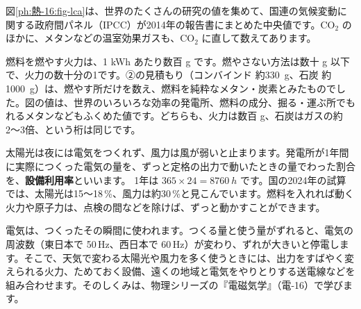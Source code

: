 図\ref{ph:熱-16:fig-lca}は、世界のたくさんの研究の値を集めて、国連の気候変動に関する政府間パネル（IPCC）が2014年の報告書にまとめた中央値です。CO$_2$ のほかに、メタンなどの温室効果ガスも、CO$_2$ に直して数えてあります。
\begin{bkfigure}
\label{ph:熱-16:fig-lca}
\end{bkfigure}
\noindent 燃料を燃やす火力は、1 kWh あたり数百 g です。燃やさない方法は数十 g 以下で、火力の数十分の1です。②の見積もり（コンバインド 約\qty{330}{g}、石炭 約\qty{1000}{g}）は、燃やす所だけを数え、燃料を純粋なメタン・炭素とみたものでした。図の値は、世界のいろいろな効率の発電所、燃料の成分、掘る・運ぶ所でもれるメタンなどもふくめた値です。どちらも、火力は数百 g、石炭はガスの約2〜3倍、という桁は同じです。

\leavevmode\label{ph:熱-16:sec5}太陽光は夜には電気をつくれず、風力は風が弱いと止まります。発電所が1年間に実際につくった電気の量を、ずっと定格の出力で動いたときの量でわった割合を、\textbf{設備利用率}といいます。
1年は $365\times24=\qty{8760}{h}$ です。国の2024年の試算では、太陽光は15〜18\,\%、風力は約30\,\%と見こんでいます。燃料を入れれば動く火力や原子力は、点検の間などを除けば、ずっと動かすことができます。

電気は、つくったその瞬間に使われます。つくる量と使う量がずれると、電気の周波数（東日本で 50\,Hz、西日本で 60\,Hz）が変わり、ずれが大きいと停電します。そこで、天気で変わる太陽光や風力を多く使うときには、出力をすばやく変えられる火力、ためておく設備、遠くの地域と電気をやりとりする送電線などを組み合わせます。そのしくみは、物理シリーズの『電磁気学』（電-16）で学びます。


